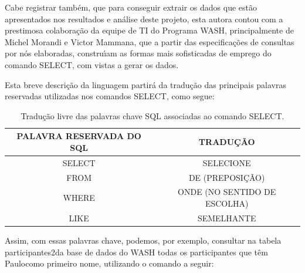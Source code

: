 \documentclass[
12pt,		%
openright,	%
twoside,  %
a4paper,			%
chapter=TITLE,		%
english,			%
french,				%
spanish,			%
brazil				%
]{USPSC-classe/USPSC}
\begin{document}
Cabe registrar tamb\'em, que para conseguir extrair os dados que est\~ao apresentados nos resultados e an\'alise deste projeto, esta autora contou com a prestimosa colabora\c{c}\~ao da equipe de TI do Programa WASH, principalmente de Michel Morandi e Victor Mammana, que a partir das especifica\c{c}\~oes de consultas por n\'os elaboradas, constru\'{\i}am as formas mais sofisticadas de emprego do comando SELECT, com vistas a gerar os dados.










Esta breve descri\c{c}\~ao da linguagem partir\'a da tradu\c{c}\~ao das principais palavras reservadas utilizadas nos comandos SELECT, como segue:














\begin{table}[htb]
\tiny
\caption{\label{0faf6421bd5dff6b3cb8bedd3f0b4212f1150970}Tradu\c{c}\~ao livre das palavras chave SQL associadas ao comando SELECT.}

\centering
\begin{tabular}{|c|c|}
\hline
PALAVRA RESERVADA DO SQL  &  TRADU\c{C}\~AO \\
\hline
SELECT  &  SELECIONE \\
FROM  &  DE (PREPOSI\c{C}\~AO) \\
WHERE  &  ONDE (NO SENTIDO DE ESCOLHA) \\
LIKE  &  SEMELHANTE \\
\hline
\end{tabular}
\end{table}


Assim, com essas palavras chave, podemos, por exemplo, consultar na tabela \textquotedbl participantes2\textquotedbl  da base de dados do WASH todas os participantes que t\^em \textquotedbl Paulo\textquotedbl  como primeiro nome, utilizando o comando a seguir:











\noindent\begin{center}\mbox{\centering{}}\end{center}
\end{document}
